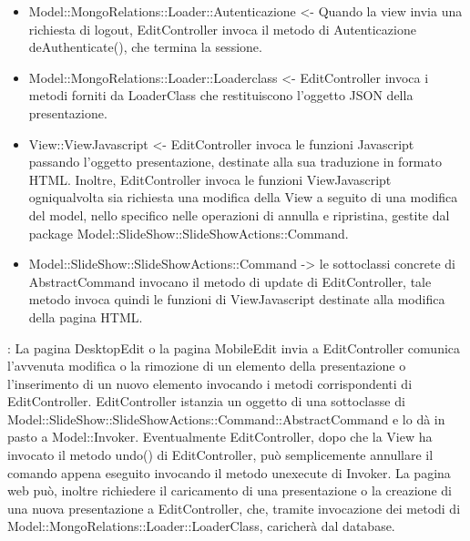 {{\begin{itemize}
			\item Model::MongoRelations::Loader::Autenticazione <- Quando la view invia una richiesta di logout, EditController invoca il metodo di Autenticazione deAuthenticate(), che termina la sessione.
			\item Model::MongoRelations::Loader::Loaderclass <- EditController invoca i metodi forniti da LoaderClass che restituiscono l'oggetto JSON della presentazione. 
			\item View::ViewJavascript <- EditController invoca le funzioni Javascript passando l'oggetto presentazione, destinate alla sua traduzione in formato HTML. Inoltre, EditController invoca le funzioni ViewJavascript ogniqualvolta sia richiesta una modifica della View a seguito di una modifica del model, nello specifico nelle operazioni di annulla e ripristina, gestite dal package Model::SlideShow::SlideShowActions::Command.
			\item Model::SlideShow::SlideShowActions::Command -> le sottoclassi concrete di AbstractCommand invocano il metodo di update di EditController, tale metodo invoca quindi le funzioni di ViewJavascript destinate alla modifica della pagina HTML.
		\end{itemize} 
		\textbf{\interfacce}: La pagina DesktopEdit o la pagina MobileEdit invia a EditController comunica l’avvenuta modifica o la rimozione di un elemento della presentazione o l’inserimento di un nuovo elemento invocando i metodi corrispondenti di EditController. EditController istanzia un oggetto di una sottoclasse di Model::SlideShow::SlideShowActions::Command::AbstractCommand e lo dà in pasto a Model::Invoker. Eventualmente EditController, dopo che la View ha invocato il metodo undo() di EditController, può semplicemente annullare il comando appena eseguito invocando il metodo unexecute di Invoker.
		La pagina web può, inoltre richiedere il caricamento di una presentazione o la creazione di una nuova presentazione a EditController, che, tramite invocazione dei metodi di Model::MongoRelations::Loader::LoaderClass, caricherà dal database.
		\\
	}
}
